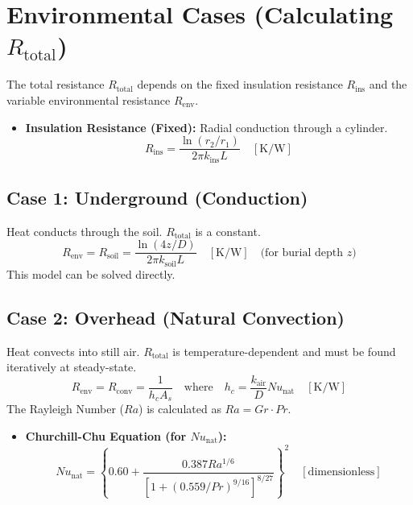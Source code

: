 \documentclass[11pt, a4paper]{article}
\begin{document}
\section{Environmental Cases (Calculating $R_{\text{total}}$)}
The total resistance $R_{\text{total}}$ depends on the fixed insulation resistance $R_{\text{ins}}$ and the variable environmental resistance $R_{\text{env}}$.

\begin{itemize}
    \item \textbf{Insulation Resistance (Fixed):} Radial conduction through a cylinder.
    \begin{equation}
        R_{\text{ins}} = \frac{\ln(r_2 / r_1)}{2 \pi k_{\text{ins}} L} \quad [\si{\kelvin\per\watt}]
    \end{equation}
\end{itemize}

\subsection{Case 1: Underground (Conduction)}
Heat conducts through the soil. $R_{\text{total}}$ is a constant.
\begin{equation}
    R_{\text{env}} = R_{\text{soil}} = \frac{\ln(4z/D)}{2 \pi k_{\text{soil}} L} \quad [\si{\kelvin\per\watt}] \quad \text{(for burial depth $z$)}
\end{equation}
This model can be solved directly.

\subsection{Case 2: Overhead (Natural Convection)}
Heat convects into still air. $R_{\text{total}}$ is temperature-dependent and must be found iteratively at steady-state.
\begin{equation}
    R_{\text{env}} = R_{\text{conv}} = \frac{1}{h_c A_s} \quad \text{where} \quad h_c = \frac{k_{\text{air}}}{D} Nu_{\text{nat}} \quad [\si{\kelvin\per\watt}]
\end{equation}
The Rayleigh Number ($Ra$) is calculated as $Ra = Gr \cdot Pr$.
\begin{itemize}
    \item \textbf{Churchill-Chu Equation (for $Nu_{\text{nat}}$):}
    \begin{equation}
        Nu_{\text{nat}} = \left\{ 0.60 + \frac{0.387 Ra^{1/6}}{\left[1 + (0.559/Pr)^{9/16}\right]^{8/27}} \right\}^2 \quad [\text{dimensionless}]
    \end{equation}
\end{itemize}
\end{document}
